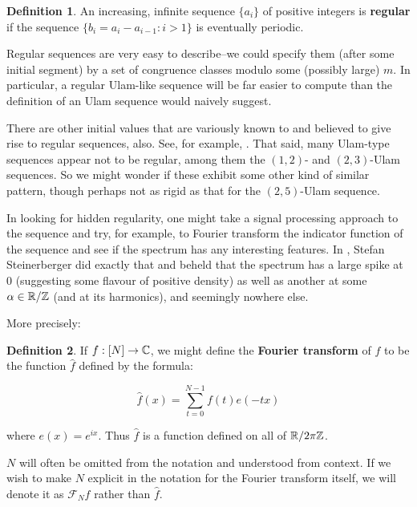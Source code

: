 \documentclass{article}
\theoremstyle{definition}
\newtheorem{definition}{Definition}
\theoremstyle{remark}
\numberwithin{equation}{section}
\begin{document}
\begin{definition}\label{def:regularity}
  An increasing, infinite sequence $\{a_i\}$ of positive integers is
  \textbf{regular} if the sequence $\{b_i = a_i - a_{i-1} : i > 1\}$
  is eventually periodic.
\end{definition}

Regular sequences are very easy to describe--we could specify them
(after some initial segment) by a set of congruence classes modulo
some (possibly large) $m$.  In particular, a regular Ulam-like
sequence will be far easier to compute than the definition of an Ulam
sequence would naively suggest.

There are other initial values that are variously known to and
believed to give rise to regular sequences, also.  See, for example,
\cite{finch:em1992}.  That said, many Ulam-type sequences appear not
to be regular, among them the $(1,2)$- and $(2,3)$-Ulam sequences.  So
we might wonder if these exhibit some other kind of similar pattern,
though perhaps not as rigid as that for the $(2,5)$-Ulam sequence.  

In looking for hidden regularity, one might take a signal processing
approach to the sequence and try, for example, to Fourier transform
the indicator function of the sequence and see if the spectrum has any
interesting features.  In \cite{steinerberger:preprint}, Stefan
Steinerberger did exactly that and beheld that the spectrum has a
large spike at 0 (suggesting some flavour of positive density) as well
as another at some $\alpha \in \mathbb{R}/\mathbb{Z}$ (and at its harmonics), and
seemingly nowhere else.

More precisely: 

\begin{definition} If $f : [N] \to \mathbb{C}$, we might define the
  \textbf{Fourier transform} of $f$ to be the function $\widehat{f}$
  defined by the formula:

  \[\widehat{f}(x) = \sum_{t=0}^{N-1} f(t) e(-tx)\]

  where $e(x) = e^{i x}$.  Thus $\widehat{f}$ is a function defined on
  all of $\mathbb{R}/2\pi\mathbb{Z}$.

  $N$ will often be omitted from the notation and understood from
  context.  If we wish to make $N$ explicit in the notation for the
  Fourier transform itself, we will denote it as $\mathcal{F}_N f$
  rather than $\widehat{f}$.
\end{definition}
\end{document}

